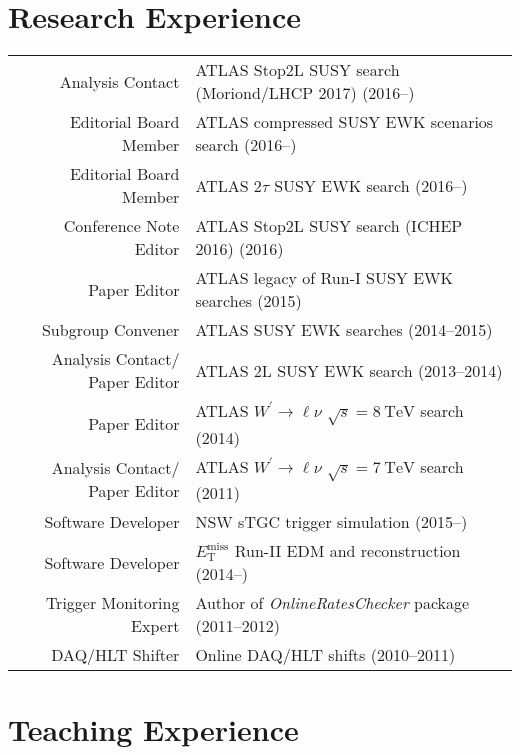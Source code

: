 \documentclass[a4paper,10pt]{article}
\begin{document}
\vspace{3mm}
\section{Research Experience}

\begin{tabular}{r | p{12cm}}
\multicolumn{1}{r|}{Analysis Contact}				& ATLAS Stop2L SUSY search (Moriond/LHCP 2017)  \hfill (2016--\phantom{0000})					\\
\multicolumn{1}{r|}{Editorial Board Member}		& ATLAS compressed SUSY EWK scenarios search \hfill (2016--\phantom{0000})				\\
\multicolumn{1}{r|}{Editorial Board Member}		& ATLAS 2$\tau$ SUSY EWK search \hfill (2016--\phantom{0000})				\\
\multicolumn{1}{r|}{Conference Note Editor}		& ATLAS Stop2L SUSY search (ICHEP 2016) \hfill (2016)					\\
\multicolumn{1}{r|}{Paper Editor}				& ATLAS legacy of Run-I SUSY EWK searches \hfill (2015) 		\\ 
\multicolumn{1}{r|}{Subgroup Convener}			& ATLAS SUSY EWK searches \hfill (2014--2015)				\\
\multicolumn{1}{r|}{Analysis Contact/ Paper Editor}	& ATLAS 2L SUSY EWK search \hfill (2013--2014)				\\
\multicolumn{1}{r|}{Paper Editor}				& ATLAS $W^{\prime}\rightarrow\ell\nu$ $\sqrt{s} = 8\ \mathrm{TeV}$  search \hfill (2014)		\\
\multicolumn{1}{r|}{Analysis Contact/ Paper Editor}	& ATLAS $W^{\prime}\rightarrow\ell\nu$ $\sqrt{s} = 7\ \mathrm{TeV}$ search \hfill (2011)		\\
\multicolumn{1}{r|}{Software Developer}			& NSW sTGC trigger simulation \hfill (2015--\phantom{0000})	\\
\multicolumn{1}{r|}{Software Developer}			& $E_{\mathrm{T}}^{\mathrm{miss}}$ Run-II EDM and reconstruction \hfill (2014--\phantom{0000})	\\
\multicolumn{1}{r|}{Trigger Monitoring Expert}		& Author of {\it OnlineRatesChecker} package \hfill (2011--2012)	\\
\multicolumn{1}{r|}{DAQ/HLT Shifter}				& Online DAQ/HLT shifts	\hfill (2010--2011)					\\
\end{tabular}

\vspace{3mm}
\section{Teaching Experience}
\end{document}
